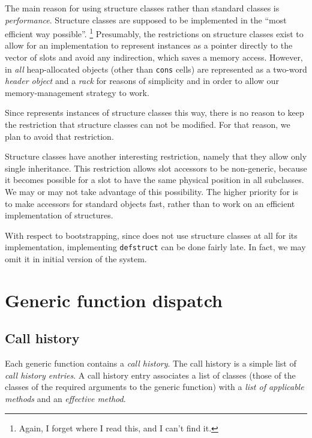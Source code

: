 The main reason for using structure classes rather than standard
classes is \emph{performance}.  Structure classes are supposed to be
implemented in the ``most efficient way possible''.%
\footnote{Again, I forget where I read this, and I can't find it.}
Presumably, the restrictions on structure classes exist to allow for
an implementation to represent instances as a pointer directly to the
vector of slots and avoid any indirection, which saves a memory
access.  However, in \sysname{} \emph{all} heap-allocated objects
(other than \texttt{cons} cells) are represented as a two-word
\emph{header object} and a \emph{rack} for reasons of
simplicity and in order to allow our memory-management strategy to
work.

Since \sysname{} represents instances of structure classes this way,
there is no reason to keep the restriction that structure classes can
not be modified.  For that reason, we plan to avoid that restriction.

Structure classes have another interesting restriction, namely that
they allow only single inheritance.  This restriction allows slot
accessors to be non-generic, because it becomes possible for a slot to
have the same physical position in all subclasses.  We may or may not
take advantage of this possibility.  The higher priority for
\sysname{} is to make accessors for standard objects fast, rather than
to work on an efficient implementation of structures. 

With respect to bootstrapping, since \sysname{} does not use structure
classes at all for its implementation, implementing \texttt{defstruct}
can be done fairly late.  In fact, we may omit it in initial version
of the system. 

\section{Generic function dispatch}
\label{sec-generic-function-dispatch}

\subsection{Call history}
\label{sec-generic-function-dispatch-call-history}

Each generic function contains a \emph{call history}.  The call
history is a simple list of \emph{call history entries}.  A call
history entry associates a list of classes (those of the classes of
the required arguments to the generic function) with a \emph{list of
  applicable methods} and an \emph{effective method}.


